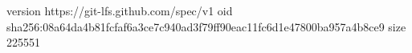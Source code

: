 version https://git-lfs.github.com/spec/v1
oid sha256:08a64da4b81fcfaf6a3ce7c940ad3f79ff90eac11fc6d1e47800ba957a4b8ce9
size 225551
